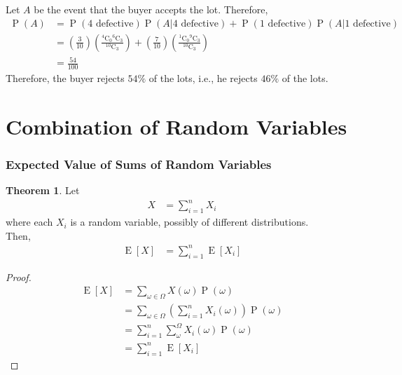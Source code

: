 \documentclass[titlepage, fleqn, a4paper, 12pt, twoside]{article}
\theoremstyle{definition}
\theoremstyle{theorem}
\newtheorem{theorem}{Theorem}
\DeclareMathOperator{\prob}{\mathrm{P}}
\DeclareMathOperator{\expct}{\mathrm{E}}
\newcommand*{\comb}[2]{{}^{#1}\mathrm{C}_{#2}}%
\begin{document}
\begin{solution}
	Let $A$ be the event that the buyer accepts the lot.
	Therefore,
	\begin{align*}
		\prob(A) & = \prob(\text{$4$ defective}) \prob(A|\text{$4$ defective}) + \prob(\text{$1$ defective}) \prob(A|\text{$1$ defective})                                                             \\
                         & = \left( \frac{3}{10} \right) \left( \frac{\comb{4}{0} \comb{6}{3}}{\comb{10}{3}} \right) + \left( \frac{7}{10} \right) \left( \frac{\comb{1}{0} \comb{9}{3}}{\comb{10}{3}} \right) \\
                         & = \frac{54}{100}
	\end{align*}
	Therefore, the buyer rejects $54\%$ of the lots, i.e., he rejects $46\%$ of the lots.
\end{solution}

\clearpage
\part{Combination of Random Variables}

\section{Expected Value of Sums of Random Variables}

\begin{theorem}
	Let
	\begin{align*}
		X & = \sum\limits_{i = 1}^{n} X_i
	\end{align*}
	where each $X_i$ is a random variable, possibly of different distributions.\\
	Then,
	\begin{align*}
		\expct[X] & = \sum\limits_{i = 1}^{n} \expct[X_i]
	\end{align*}
\end{theorem}

\begin{proof}
	\begin{align*}
		\expct[X] & = \sum\limits_{\omega \in \Omega} X(\omega) \prob(\omega)                                          \\
                          & = \sum\limits_{\omega \in \Omega} \left( \sum\limits_{i = 1}^{n} X_i(\omega) \right) \prob(\omega) \\
                          & = \sum\limits_{i = 1}^{n} \sum\limits_{\omega}^{\Omega} X_i(\omega) \prob(\omega)                  \\
                          & = \sum\limits_{i = 1}^{n} \expct[X_i]
	\end{align*}
\end{proof}
\end{document}
